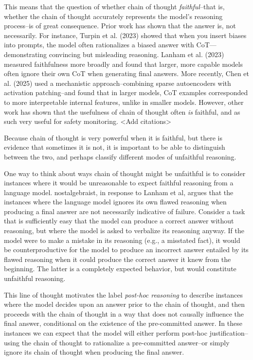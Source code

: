 \documentclass{article}
\begin{document}
This means that the question of whether chain of thought \textit{faithful}--that is, whether the chain of thought accurately represents the model's reasoning process--is of great consequence. 
Prior work has shown that the answer is, not necessarily. 
For instance, Turpin et al. (2023) showed that when you insert biases into prompts, the model often rationalizes a biased answer with CoT—demonstrating convincing but misleading reasoning. 
Lanham et al. (2023) measured faithfulness more broadly and found that larger, more capable models often ignore their own CoT when generating final answers. 
More recently, Chen et al. (2025) used a mechanistic approach--combining sparse autoencoders with activation patching--and found that in larger models, CoT examples corresponded to more interpretable internal features, unlike in smaller models. 
However, other work has shown that the usefulness of chain of thought often \textit{is} faithful, and as such very useful for safety monitoring. <Add citations>

Because chain of thought is very powerful when it is faithful, but there is evidence that sometimes it is not, it is important to be able to distinguish between the two, and perhaps classify different modes of unfaithful reasoning.

One way to think about ways chain of thought might be unfaithful is to consider instances where it would be unreasonable to expect faithful reasoning from a language model. 
nostalgebraist, in response to Lanham et al, argues that the instances where the language model ignores its own flawed reasoning when producing a final answer are not necessarily indicative of failure. 
Consider a task that is sufficiently easy that the model can produce a correct answer without reasoning, but where the model is asked to verbalize its reasoning anyway. 
If the model were to make a mistake in its reasoning (e.g., a misstated fact), it would be counterproductive for the model to produce an incorrect answer entailed by its flawed reasoning when it could produce the correct answer it knew from the beginning. 
The latter is a completely expected behavior, but would constitute unfaithful reasoning.

This line of thought motivates the label \textit{post-hoc reasoning} to describe instances where the model decides upon an answer prior to the chain of thought, and then proceeds with the chain of thought in a way that does not causally influence the final answer, conditional on the existence of the pre-committed answer. 
In these instances we can expect that the model will either perform post-hoc justification--using the chain of thought to rationalize a pre-committed answer--or simply ignore its chain of thought when producing the final answer.
\end{document}
